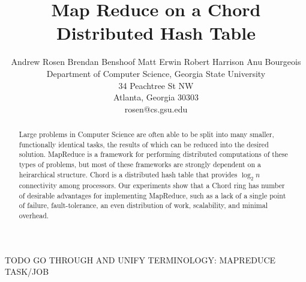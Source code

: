 \documentclass[conference, compsocconf, letterpaper]{IEEEtran}
\title{Map Reduce on a Chord Distributed Hash Table}
\author{
Andrew Rosen \qquad Brendan Benshoof \qquad Matt Erwin \qquad Robert Harrison \qquad Anu Bourgeois  \\Department of Computer Science, Georgia State University\\ 34 Peachtree St NW \\ Atlanta, Georgia 30303\\  rosen@cs.gsu.edu }
\begin{document}
\maketitle

\begin{abstract}

Large problems in Computer Science are often able to be split into many smaller, functionally identical tasks, the results of which can be reduced into the desired solution.  MapReduce is a framework for 
performing distributed computations of these types of problems, but most of these frameworks are strongly dependent on a heirarchical structure.  Chord is a distributed hash table that provides $\log_{2}n$ connectivity among processors.  Our experiments show that a Chord ring has number of desirable advantages for implementing MapReduce, such as a lack of a single point of failure, fault-tolerance, an even distribution of work, scalability, and minimal overhead.


\end{abstract}

TODO GO THROUGH AND UNIFY TERMINOLOGY:  MAPREDUCE TASK/JOB
\end{document}
